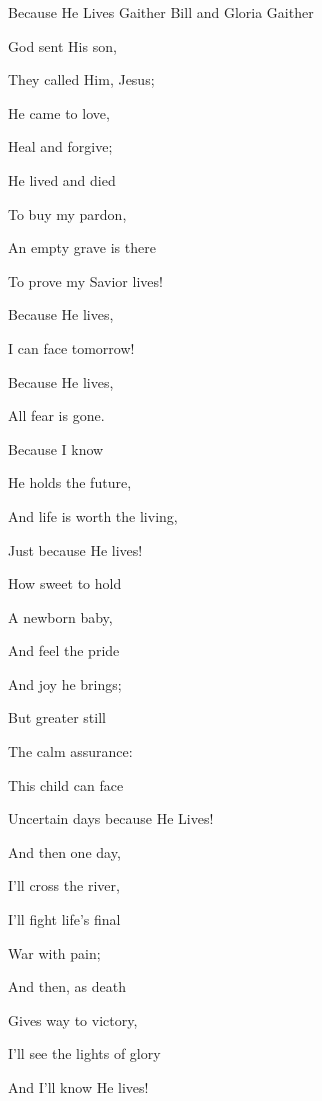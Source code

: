 \documentclass[12pt]{book}
\begin{document}
\begin{song}{Because He Lives}{}
  { Gaither}
  {Bill and Gloria Gaither}
  {}
  {}

  \begin{SBVerse}
    God sent His son,

    They called Him, Jesus;

    He came to love,

    Heal and forgive;

    He lived and died

    To buy my pardon,

    An empty grave is there

    To prove my Savior lives!
  \end{SBVerse}

  \begin{SBOpGroup}
    Because He lives,

    I can face tomorrow!

    Because He lives,

    All fear is gone.

    Because I know

    He holds the future,

    And life is worth the living,

    Just because He lives!
  \end{SBOpGroup}

  \begin{SBVerse}
    How sweet to hold

    A newborn baby,

    And feel the pride

    And joy he brings;

    But greater still

    The calm assurance:

    This child can face

    Uncertain days because He Lives!
  \end{SBVerse}

  \begin{SBVerse}
    And then one day,

    I'll cross the river,

    I'll fight life's final

    War with pain;

    And then, as death

    Gives way to victory,

    I'll see the lights of glory

    And I'll know He lives!
  \end{SBVerse}
\end{song}
\end{document}
